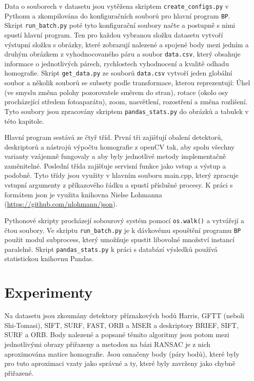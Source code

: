 Data o souborech v datasetu jsou vytěžena skriptem \verb|create_configs.py| v Pythonu a zkompilována do konfiguračních souborů pro hlavní program \verb|BP|. Skript \verb|run_batch.py| poté tyto konfigurační soubory načte a postupně s nimi spustí hlavní program. Ten pro každou vybranou složku datasetu vytvoří výstupní složku s obrázky, které zobrazují nalezené a spojené body mezi jedním a druhým obrázkem z vyhodnocovaného páru a soubor \verb|data.csv|, který obsahuje informace o jednotlivých párech, rychlostech vyhodnocení a kvalitě odhadu homografie. Skript \verb|get_data.py| ze souborů \verb|data.csv| vytvoří jeden globální soubor a několik souborů se subsety podle transformace, kterou reprezentují: Úhel (ve smyslu změna polohy pozorovatele směrem do stran), rotace (okolo osy procházející středem fotoaparátu), zoom, nasvětlení, rozostření a změna rozlišení. Tyto soubory jsou zpracovány skriptem \verb|pandas_stats.py| do obrázků a tabulek v této kapitole.

Hlavní program sestává ze čtyř tříd. První tři zajišťují obalení detektorů, deskriptorů a nástrojů výpočtu homografie z openCV tak, aby spolu všechny varianty vzájemně fungovaly a aby byly jednotlivé metody implementačně zaměnitelné. Poslední třída zajišťuje servisní funkce jako vstup a výstup a podobně. Tyto třídy jsou využity v hlavním souboru main.cpp, který zpracuje vstupní argumenty z příkazového řádku a spustí příslušné procesy. K práci s formátem json je využita knihovna Nielse Lohmanna (\url{https://github.com/nlohmann/json}).

Pythonové skripty procházejí sobourový systém pomocí \verb|os.walk()| a vytvářejí a čtou soubory. Ve skriptu \verb|run_batch.py| je k dávkovému spouštění programu \verb|BP| použit modul subprocess, který umožňuje spustit libovolné množství instancí paralelně. Skript \verb|pandas_stats.py| k práci s databází výsledků používá statistickou knihovnu Pandas.

\section{Experimenty}

Na datasetu jsou zkoumány detektory příznakových bodů Harris, GFTT (neboli Shi-Tomasi), SIFT, SURF, FAST, ORB a MSER a deskriptory BRIEF, SIFT, SURF a ORB. Body nalezené a popsané těmito algoritmy jsou potom mezi jednotlivými obrazy přiřazeny a metodou na bázi RANSAC je z nich aproximována matice homografie. Jsou označeny body (páry bodů), které byly pro tuto aproximaci vzaty jako správné a ty,  které byly zavrženy jako chybně přiřazené.


